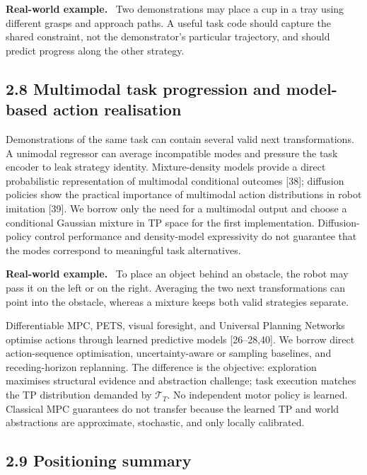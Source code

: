 \documentclass[11pt]{article}
\newenvironment{example}{%
  \par\smallskip\noindent\begin{minipage}{\textwidth}%
  \color{teal!60!black}\small
  \textbf{\color{teal!70!black}Real-world example.}\
}{%
  \end{minipage}\par\smallskip}
\begin{document}
\begin{example}
Two demonstrations may place a cup in a tray using different grasps and approach paths. A useful task code should capture the shared
constraint, not the demonstrator's particular trajectory, and should predict progress along the other strategy.
\end{example}

\subsection*{2.8 Multimodal task progression and model-based action realisation}

Demonstrations of the same task can contain several valid next transformations. A unimodal regressor can average incompatible modes
and pressure the task encoder to leak strategy identity. Mixture-density models provide a direct probabilistic representation of
multimodal conditional outcomes [38]; diffusion policies show the practical importance of multimodal action distributions in robot
imitation [39]. We borrow only the need for a multimodal output and choose a conditional Gaussian mixture in TP space for the first
implementation. Diffusion-policy control performance and density-model expressivity do not guarantee that the modes correspond to
meaningful task alternatives.

\begin{example}
To place an object behind an obstacle, the robot may pass it on the left or on the right. Averaging the two next transformations can
point into the obstacle, whereas a mixture keeps both valid strategies separate.
\end{example}

Differentiable MPC, PETS, visual foresight, and Universal Planning Networks optimise actions through learned predictive models
[26--28,40]. We borrow direct action-sequence optimisation, uncertainty-aware or sampling baselines, and receding-horizon
replanning. The difference is the objective: exploration maximises structural evidence and abstraction challenge; task execution
matches the TP distribution demanded by $\mathcal T_T$. No independent motor policy is learned. Classical MPC guarantees do not
transfer because the learned TP and world abstractions are approximate, stochastic, and only locally calibrated.

\subsection*{2.9 Positioning summary}
\end{document}
